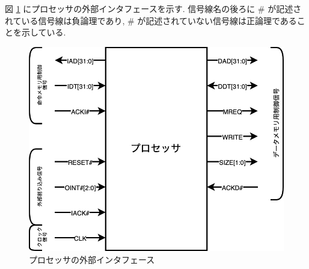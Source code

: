 \documentclass[../specifications.tex]{subfiles}
\begin{document}
  図 \ref{fig:external-interface} にプロセッサの外部インタフェースを示す.
  信号線名の後ろに \# が記述されている信号線は負論理であり, 
  \# が記述されていない信号線は正論理であることを示している.

  \begin{figure}
    \includegraphics[scale=1.5, bb=-75 0 50 110]{../../images/external_interface.png}
    \caption{プロセッサの外部インタフェース}
    \label{fig:external-interface}
  \end{figure}
\end{document}
